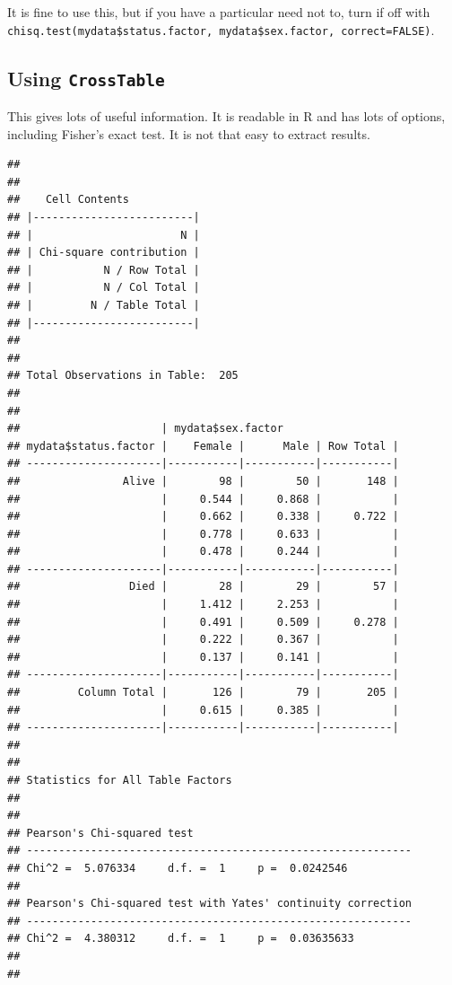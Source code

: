 \documentclass[12pt,]{krantz}
\makeatletter
\newenvironment{Shaded}{\begin{snugshade}}{\end{snugshade}}
\newcommand{\CommentTok}[1]{\textcolor[rgb]{0.56,0.35,0.01}{\textit{#1}}}
\newcommand{\DataTypeTok}[1]{\textcolor[rgb]{0.13,0.29,0.53}{#1}}
\newcommand{\KeywordTok}[1]{\textcolor[rgb]{0.13,0.29,0.53}{\textbf{#1}}}
\newcommand{\NormalTok}[1]{#1}
\newcommand{\OperatorTok}[1]{\textcolor[rgb]{0.81,0.36,0.00}{\textbf{#1}}}
\newcommand{\OtherTok}[1]{\textcolor[rgb]{0.56,0.35,0.01}{#1}}
\newenvironment{kframe}{%
\medskip{}
\setlength{\fboxsep}{.8em}
 \def\at@end@of@kframe{}%
 \ifinner\ifhmode%
  \def\at@end@of@kframe{\end{minipage}}%
  \begin{minipage}{\columnwidth}%
 \fi\fi%
 \def\FrameCommand##1{\hskip\@totalleftmargin \hskip-\fboxsep
 \colorbox{shadecolor}{##1}\hskip-\fboxsep
     \hskip-\linewidth \hskip-\@totalleftmargin \hskip\columnwidth}%
 \MakeFramed {\advance\hsize-\width
   \@totalleftmargin\z@ \linewidth\hsize
   \@setminipage}}%
 {\par\unskip\endMakeFramed%
 \at@end@of@kframe}
\renewenvironment{Shaded}{\begin{kframe}}{\end{kframe}}
\theoremstyle{definition}
\theoremstyle{definition}
\theoremstyle{definition}
\theoremstyle{remark}
\makeatother
\begin{document}
It is fine to use this, but if you have a particular need not to, turn
if off with
\texttt{chisq.test(mydata\$status.factor,\ mydata\$sex.factor,\ correct=FALSE)}.

\hypertarget{using-crosstable}{%
\subsection{\texorpdfstring{Using
\texttt{CrossTable}}{Using CrossTable}}\label{using-crosstable}}

This gives lots of useful information. It is readable in R and has lots
of options, including Fisher's exact test. It is not that easy to
extract results. \newpage

\begin{Shaded}
\end{Shaded}

\begin{verbatim}
## 
##  
##    Cell Contents
## |-------------------------|
## |                       N |
## | Chi-square contribution |
## |           N / Row Total |
## |           N / Col Total |
## |         N / Table Total |
## |-------------------------|
## 
##  
## Total Observations in Table:  205 
## 
##  
##                      | mydata$sex.factor 
## mydata$status.factor |    Female |      Male | Row Total | 
## ---------------------|-----------|-----------|-----------|
##                Alive |        98 |        50 |       148 | 
##                      |     0.544 |     0.868 |           | 
##                      |     0.662 |     0.338 |     0.722 | 
##                      |     0.778 |     0.633 |           | 
##                      |     0.478 |     0.244 |           | 
## ---------------------|-----------|-----------|-----------|
##                 Died |        28 |        29 |        57 | 
##                      |     1.412 |     2.253 |           | 
##                      |     0.491 |     0.509 |     0.278 | 
##                      |     0.222 |     0.367 |           | 
##                      |     0.137 |     0.141 |           | 
## ---------------------|-----------|-----------|-----------|
##         Column Total |       126 |        79 |       205 | 
##                      |     0.615 |     0.385 |           | 
## ---------------------|-----------|-----------|-----------|
## 
##  
## Statistics for All Table Factors
## 
## 
## Pearson's Chi-squared test 
## ------------------------------------------------------------
## Chi^2 =  5.076334     d.f. =  1     p =  0.0242546 
## 
## Pearson's Chi-squared test with Yates' continuity correction 
## ------------------------------------------------------------
## Chi^2 =  4.380312     d.f. =  1     p =  0.03635633 
## 
## 
\end{verbatim}
\end{document}
